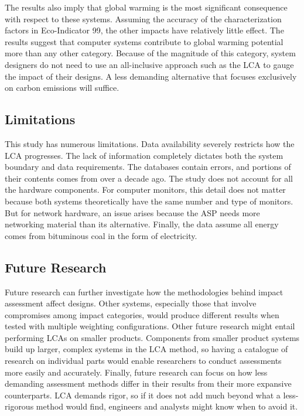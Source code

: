 \documentclass[final,journal,10pt,letterpaper,oneside,twocolumn,compsoc]%
{IEEEtran}
\begin{document}
The results also imply that global warming is the most significant consequence
with respect to these systems. Assuming the accuracy of the  characterization
factors in Eco-Indicator 99, the other impacts have relatively little effect.
The results suggest that computer systems contribute to global warming potential
more than any other category. Because of the magnitude of this category, system
designers do not need to use an all-inclusive approach such as the LCA to
gauge the impact of their designs. A less demanding alternative that focuses
exclusively on carbon emissions will suffice.

\subsection{Limitations}
This study has numerous limitations. Data availability severely restricts how
the LCA progresses. The lack of information completely dictates both the system
boundary and data requirements. The databases contain errors, and portions of
their
contents comes from over a decade ago. The study does not account for all the
hardware components. For computer monitors, this detail does not matter because
both systems theoretically have the same number and type of monitors. But for
network hardware, an issue arises because the ASP needs more networking material
than its alternative. Finally, the data assume all energy comes from bituminous
coal in the form of electricity.

\subsection{Future Research}
Future research can further investigate how the methodologies behind impact
assessment affect designs. Other systems, especially those that involve
compromises among impact categories, would produce different results when
tested with multiple weighting configurations. Other future research might
entail performing LCAs on smaller products. Components from smaller product
systems build up larger, complex systems in the LCA method, so having a
catalogue of research on individual parts would enable researchers to conduct
assessments more easily and accurately. Finally, future research can focus on
how less demanding assessment methods differ in their results from their
more expansive counterparts. LCA demands rigor, so if
it does not add much beyond what a less-rigorous method would find,
engineers and analysts might know when to avoid it.
\end{document}
